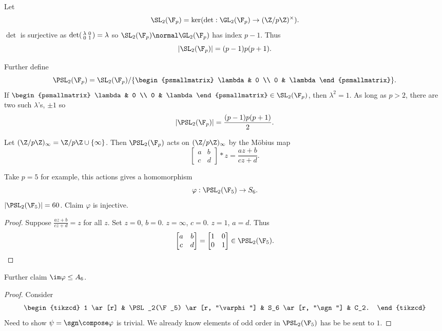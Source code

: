 \documentclass[a4paper]{article}
\theoremstyle{definition}
\begin{document}
\begin{eg}
  Let
  \[
    \SL_2(\F_p) = \ker (\det: \GL_2(\F_p) \to (\Z/p\Z)^\times).
  \]
  \(\det\) is surjective as \(\det \begin{psmallmatrix} \lambda & 0 \\ 0 & 1 \end{psmallmatrix} = \lambda\) so \(\SL_2(\F_p) \normal \GL_2(\F_p)\) has index \(p - 1\). Thus
  \[
    |\SL_2(\F_p)| = (p - 1)p(p + 1).
  \]

  Further define
  \[
    \PSL_2(\F_p) = \SL_2(\F_p)/
    \{
    \begin{psmallmatrix}
      \lambda & 0 \\
      0 & \lambda
    \end{psmallmatrix}
    \}.
  \]
  If \(\begin{psmallmatrix} \lambda & 0 \\ 0 & \lambda \end{psmallmatrix} \in \SL_2(\F_p)\), then \(\lambda^2 = 1\). As long as \(p > 2\), there are two such \(\lambda\)'s, \(\pm 1\) so
  \[
    |\PSL_2(\F_p)| = \frac{(p - 1)p(p + 1)}{2}.
  \]

  Let \((\Z/p\Z)_\infty = \Z/p\Z \cup \{\infty\}\). Then \(\PSL_2(\F_p)\) acts on \((\Z/p\Z)_\infty\) by the Möbius map
  \[
    \begin{bmatrix}
      a & b \\
      c & d
    \end{bmatrix}
    * z = \frac{az + b}{cz + d}.
  \]

  Take \(p = 5\) for example, this actions gives a homomorphism
  \[
    \varphi: \PSL_2(\F_5) \to S_6.
  \]
  \(|\PSL_2(\F_5)| = 60\). Claim \(\varphi\) is injective.

  \begin{proof}
    Suppose \(\frac{az + b}{cz + d} = z\) for all \(z\). Set \(z = 0\), \(b = 0\). \(z = \infty\), \(c = 0\). \(z = 1\), \(a = d\). Thus
    \[
      \begin{bmatrix}
        a & b \\
        c & d
      \end{bmatrix}
      =
      \begin{bmatrix}
        1 & 0 \\
        0 & 1
      \end{bmatrix}
      \in \PSL_2(\F_5).
    \]
  \end{proof}

  Further claim \(\im \varphi \leq A_6\).

  \begin{proof}
    Consider
    \[
      \begin{tikzcd}
        1 \ar[r] & \PSL_2(\F_5) \ar[r, "\varphi"] & S_6 \ar[r, "\sgn"] & C_2.
      \end{tikzcd}
    \]
    Need to show \(\psi = \sgn \compose \varphi\) is trivial. We already know elements of odd order in \(\PSL_2(\F_5)\) has be be sent to \(1\).


\end{proof}
\end{eg}
\end{document}

